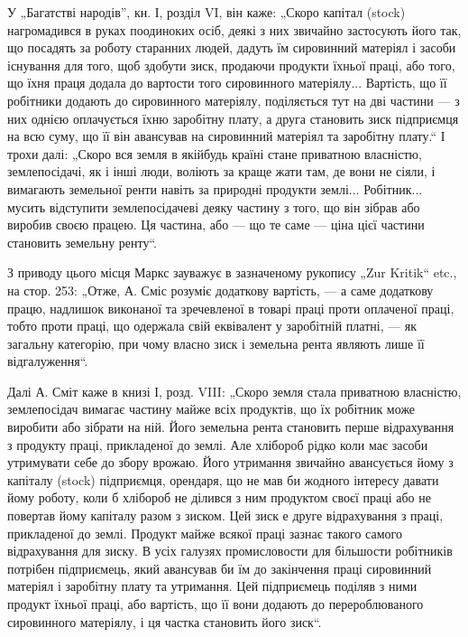 У „Багатстві народів”, кн. І, розділ VI, він каже: „Скоро капітал
(stock) нагромадився в руках поодиноких осіб, деякі з них звичайно застосують
його так, що посадять за роботу старанних людей, дадуть їм
сировинний матеріял і засоби існування для того, щоб здобути зиск,
продаючи продукти їхньої праці, або того, що їхня праця додала до
вартости того сировинного матеріялу... Вартість, що її робітники
додають до сировинного матеріялу, поділяється тут на дві частини —
з них однією оплачується їхню заробітну плату, а друга становить
зиск підприємця на всю суму, що її він авансував на сировинний
матеріял та заробітну плату.“ І трохи далі: „Скоро вся земля в якійбудь
країні стане приватною власністю, землепосідачі, як і інші люди,
воліють за краще жати там, де вони не сіяли, і вимагають земельної
ренти навіть за природні продукти землі... Робітник... мусить відступити
землепосідачеві деяку частину з того, що він зібрав або виробив
своєю працею. Ця частина, або — що те саме — ціна цієї частини становить
земельну ренту“.

З приводу цього місця Маркс зауважує в зазначеному рукопису
„Zur Kritik“ etc., на стор. 253: „Отже, А. Сміс розуміє додаткову вартість,
— а саме додаткову працю, надлишок виконаної та зречевленої в
товарі праці проти оплаченої праці, тобто проти праці, що одержала
свій еквівалент у заробітній платні, — як загальну категорію, при чому
власно зиск і земельна рента являють лише її відгалуження“.

Далі А. Сміт каже в книзі І, розд. VIII: „Скоро земля стала приватною
власністю, землепосідач вимагає частину майже всіх продуктів, що
їх робітник може виробити або зібрати на ній. Його земельна рента
становить перше відрахування з продукту праці, прикладеної до землі.
Але хлібороб рідко коли має засоби утримувати себе до збору врожаю.
Його утримання звичайно авансується йому з капіталу (stock) підприємця,
орендаря, що не мав би жодного інтересу давати йому роботу, коли б
хлібороб не ділився з ним продуктом своєї праці або не повертав йому
капіталу разом з зиском. Цей зиск е друге відрахування з праці, прикладеної
до землі. Продукт майже всякої праці зазнає такого самого
відрахування для зиску. В усіх галузях промисловости для більшости робітників
потрібен підприємець, який авансував би їм до закінчення праці
сировинний матеріял і заробітну плату та утримання. Цей підприємець
поділяв з ними продукт їхньої праці, або вартість, що її вони додають
до перероблюваного сировинного матеріялу, і ця частка становить його
зиск“.

